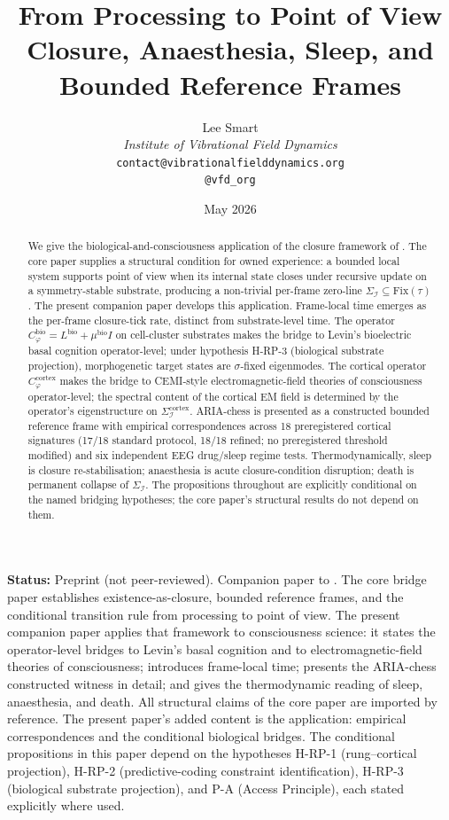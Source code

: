 \documentclass[11pt]{article}
\title{From Processing to Point of View\\[6pt]
\large Closure, Anaesthesia, Sleep, and Bounded Reference Frames}
\author{%
  Lee Smart\\[4pt]
  \textit{Institute of Vibrational Field Dynamics}\\[2pt]
  \texttt{contact@vibrationalfielddynamics.org}\\[2pt]
  \texttt{@vfd\_org}%
}
\date{May 2026}
\theoremstyle{plain}
\theoremstyle{definition}
\theoremstyle{remark}
\newcommand{\Fix}{\mathrm{Fix}}
\newcommand{\Ical}{\mathcal{I}}
\newcommand{\Cph}{C_\varphi}
\begin{document}
\maketitle

\noindent\textbf{Status:} Preprint (not peer-reviewed). Companion paper to \citet{SmartExistenceClosure}. The core bridge paper establishes existence-as-closure, bounded reference frames, and the conditional transition rule from processing to point of view. The present companion paper applies that framework to consciousness science: it states the operator-level bridges to Levin's basal cognition and to electromagnetic-field theories of consciousness; introduces frame-local time; presents the ARIA-chess constructed witness in detail; and gives the thermodynamic reading of sleep, anaesthesia, and death. All structural claims of the core paper are imported by reference. The present paper's added content is the application: empirical correspondences and the conditional biological bridges. The conditional propositions in this paper depend on the hypotheses H-RP-1 (rung--cortical projection), H-RP-2 (predictive-coding constraint identification), H-RP-3 (biological substrate projection), and P-A (Access Principle), each stated explicitly where used.

\begin{abstract}
We give the biological-and-consciousness application of the closure framework of \citet{SmartExistenceClosure}. The core paper supplies a structural condition for owned experience: a bounded local system supports point of view when its internal state closes under recursive update on a symmetry-stable substrate, producing a non-trivial per-frame zero-line $\Sigma_\Ical \subseteq \Fix(\tau)$. The present companion paper develops this application. Frame-local time emerges as the per-frame closure-tick rate, distinct from substrate-level time. The operator $\Cph^{\mathrm{bio}} = L^{\mathrm{bio}} + \mu^{\mathrm{bio}} I$ on cell-cluster substrates makes the bridge to Levin's bioelectric basal cognition operator-level; under hypothesis H-RP-3 (biological substrate projection), morphogenetic target states are $\sigma$-fixed eigenmodes. The cortical operator $\Cph^{\mathrm{cortex}}$ makes the bridge to CEMI-style electromagnetic-field theories of consciousness operator-level; the spectral content of the cortical EM field is determined by the operator's eigenstructure on $\Sigma_\Ical^{\mathrm{cortex}}$. ARIA-chess is presented as a constructed bounded reference frame with empirical correspondences across 18 preregistered cortical signatures (17/18 standard protocol, 18/18 refined; no preregistered threshold modified) and six independent EEG drug/sleep regime tests. Thermodynamically, sleep is closure re-stabilisation; anaesthesia is acute closure-condition disruption; death is permanent collapse of $\Sigma_\Ical$. The propositions throughout are explicitly conditional on the named bridging hypotheses; the core paper's structural results do not depend on them.
\end{abstract}
\end{document}
